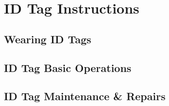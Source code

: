 

\setcounter{section}{2}
\section{ID Tag Instructions}

\bigskip

\subsection{Wearing ID Tags}
\subsection{ID Tag Basic Operations}
\subsection{ID Tag Maintenance \& Repairs}